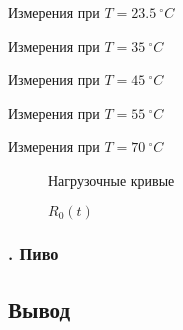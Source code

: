 \documentclass[a4paper, 12pt]{article}
\def \picdir{pic/}
\def \tbldir{tex/tables/}
\begin{document}
\begin{table}[h!]
  \begin{center}
    
    \caption{Измерения при $T = 23.5\ ^\circ C$}
  \end{center}
\end{table}		

\begin{table}[h!]
  \begin{center}
    
    \caption{Измерения при $T = 35\ ^\circ C$}
  \end{center}
\end{table}		

\begin{table}[h!]
  \begin{center}
    
    \caption{Измерения при $T = 45\ ^\circ C$}
  \end{center}
\end{table}		

\begin{table}[h!]
  \begin{center}
    
    \caption{Измерения при $T = 55\ ^\circ C$}
  \end{center}
\end{table}

\begin{table}[h!]
  \begin{center}
    
    \caption{Измерения при $T = 70\ ^\circ C$}
  \end{center}
\end{table}

\begin{figure}[h!]
  \begin{center}
    
    \caption{Нагрузочные кривые}
  \end{center}
\end{figure}

\begin{figure}[h!]
  \begin{center}
    
    \caption{$R_0(t)$}
  \end{center}
\end{figure}

\subsubsection*{. Пиво }
\subsection*{{Вывод}}

\lipsum[7-7]
\end{document}
